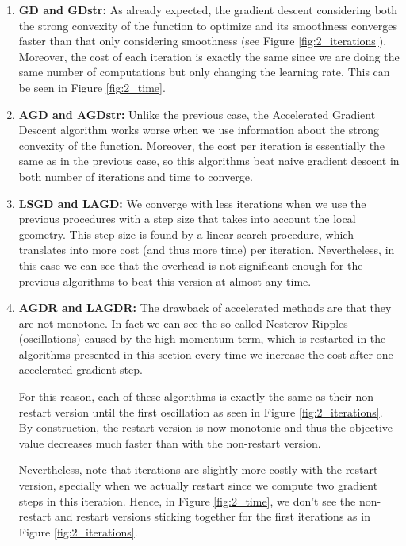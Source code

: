\documentclass[letterpaper]{article}
\providecommand{\1}{\mathbf{1}}
\providecommand{\0}{\mathbf{0}}
\begin{document}
\begin{enumerate}[label=(\alph*)]
    \item \textbf{GD and GDstr: }As already expected, the gradient descent considering both the strong convexity of the function to optimize and its smoothness converges faster than that only considering smoothness (see Figure \ref{fig:2_iterations}). Moreover, the cost of each iteration is exactly the same since we are doing the same number of computations but only changing the learning rate. This can be seen in Figure \ref{fig:2_time}.
    
    \item \textbf{AGD and AGDstr: }Unlike the previous case, the Accelerated Gradient Descent algorithm works worse when we use information about the strong convexity of the function. Moreover, the cost per iteration is essentially the same as in the previous case, so this algorithms beat naive gradient descent in both number of iterations and time to converge.
    
    \item \textbf{LSGD and LAGD: }We converge with less iterations when we use the previous procedures with a step size that takes into account the local geometry. This step size is found by a linear search procedure, which translates into more cost (and thus more time) per iteration. Nevertheless, in this case we can see that the overhead is not significant enough for the previous algorithms to beat this version at almost any time.
    
    \item \textbf{AGDR and LAGDR: }The drawback of accelerated methods are that they are not monotone. In fact we can see the so-called Nesterov Ripples (oscillations) caused by the high momentum term, which is restarted in the algorithms presented in this section every time we increase the cost after one accelerated gradient step.
    
    For this reason, each of these algorithms is exactly the same as their non-restart version until the first oscillation as seen in Figure \ref{fig:2_iterations}. By construction, the restart version is now monotonic and thus the objective value decreases much faster than with the non-restart version.
    
    Nevertheless, note that iterations are slightly more costly with the restart version, specially when we actually restart since we compute two gradient steps in this iteration. Hence, in Figure \ref{fig:2_time}, we don't see the non-restart and restart versions sticking together for the first iterations as in Figure \ref{fig:2_iterations}.
    

\end{enumerate}
\end{document}
